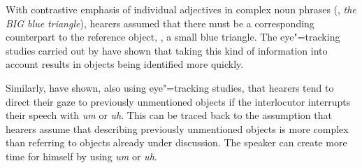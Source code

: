 With contrastive emphasis of individual adjectives in complex noun phrases
(\eg, \emph{the BIG blue triangle}), hearers assumed that there must be a corresponding counterpart to the reference object, \eg, a small blue triangle.
The eye"=tracking studies carried out by \citet{TSKES96a} have shown that taking this kind of information into account
results in objects being identified more quickly.

Similarly, \citet{ATAF2004a} have shown, also using eye"=tracking studies, that hearers tend to direct their gaze
to previously unmentioned objects if the interlocutor interrupts their speech with \emph{um} or \emph{uh}.
This can be traced back to the assumption that hearers assume that describing previously unmentioned objects is more
complex than referring to objects already under discussion. The speaker can create more time for himself
by using \emph{um}
or \emph{uh}.

